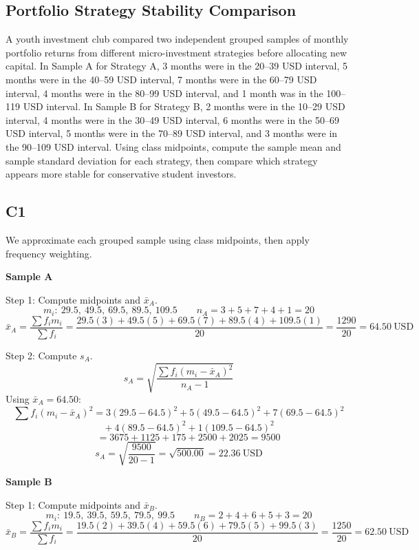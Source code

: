 \begin{ExamProblems}
		\section{Portfolio Strategy Stability Comparison}
		A youth investment club compared two independent grouped samples of monthly portfolio returns from different micro-investment strategies before allocating new capital. In Sample A for Strategy A, 3 months were in the 20--39 USD interval, 5 months were in the 40--59 USD interval, 7 months were in the 60--79 USD interval, 4 months were in the 80--99 USD interval, and 1 month was in the 100--119 USD interval. In Sample B for Strategy B, 2 months were in the 10--29 USD interval, 4 months were in the 30--49 USD interval, 6 months were in the 50--69 USD interval, 5 months were in the 70--89 USD interval, and 3 months were in the 90--109 USD interval. Using class midpoints, compute the sample mean and sample standard deviation for each strategy, then compare which strategy appears more stable for conservative student investors.

		\subsection*{C1}
		We approximate each grouped sample using class midpoints, then apply frequency weighting.

		\textbf{Sample A}

		Step 1: Compute midpoints and $\bar{x}_A$.
		\[
		m_i:\ 29.5,\ 49.5,\ 69.5,\ 89.5,\ 109.5
		\qquad
		n_A = 3+5+7+4+1 = 20
		\]
		\[
		\bar{x}_A = \frac{\sum f_i m_i}{\sum f_i}
		= \frac{29.5(3)+49.5(5)+69.5(7)+89.5(4)+109.5(1)}{20}
		= \frac{1290}{20}
		= 64.50\ \text{USD}
		\]

		Step 2: Compute $s_A$.
		\[
		s_A = \sqrt{\frac{\sum f_i(m_i-\bar{x}_A)^2}{n_A-1}}
		\]
		Using $\bar{x}_A=64.50$:
		\[
		\sum f_i(m_i-\bar{x}_A)^2 = 3(29.5-64.5)^2 + 5(49.5-64.5)^2 + 7(69.5-64.5)^2
		\]
		\[
		\qquad + 4(89.5-64.5)^2 + 1(109.5-64.5)^2
		\]
		\[
		\qquad = 3675 + 1125 + 175 + 2500 + 2025 = 9500
		\]
		\[
		s_A = \sqrt{\frac{9500}{20-1}} = \sqrt{500.00} = 22.36\ \text{USD}
		\]

		\textbf{Sample B}

		Step 1: Compute midpoints and $\bar{x}_B$.
		\[
		m_i:\ 19.5,\ 39.5,\ 59.5,\ 79.5,\ 99.5
		\qquad
		n_B = 2+4+6+5+3 = 20
		\]
		\[
		\bar{x}_B = \frac{\sum f_i m_i}{\sum f_i}
		= \frac{19.5(2)+39.5(4)+59.5(6)+79.5(5)+99.5(3)}{20}
		= \frac{1250}{20}
		= 62.50\ \text{USD}
		\]


\end{ExamProblems}
